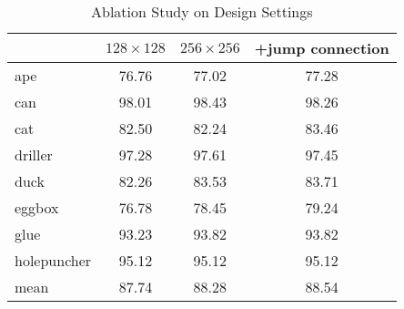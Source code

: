 \begin{table}
    \centering
    \caption{Ablation Study on Design Settings}
    \begin{tabular}{lccc}
    \toprule 
    & $128\times128$ & $256\times256$ & +jump connection \\
    \midrule
    ape & 76.76 & 77.02 & 77.28 \\
    can & 98.01 & 98.43 & 98.26 \\
    cat & 82.50 & 82.24 & 83.46 \\
    driller & 97.28 & 97.61 & 97.45 \\
    duck & 82.26 & 83.53 & 83.71 \\
    eggbox & 76.78 & 78.45 & 79.24 \\
    glue & 93.23 & 93.82 & 93.82 \\
    holepuncher & 95.12 & 95.12 & 95.12 \\
    \midrule
    mean & 87.74 & 88.28 & 88.54 \\
    \bottomrule
  \end{tabular}
  \label{tab:main_ablation}
\end{table}